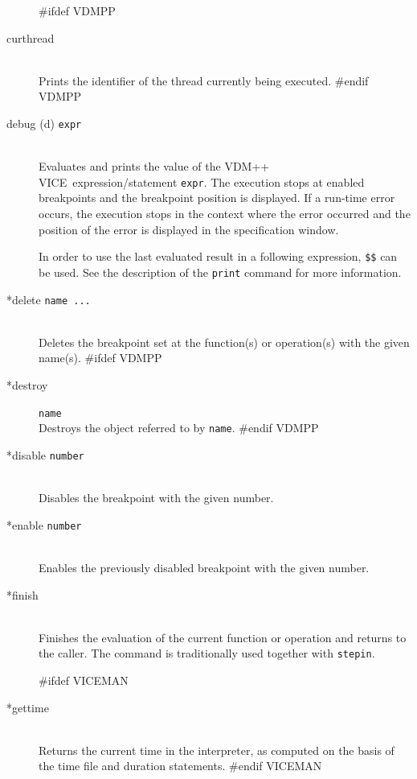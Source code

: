 \documentclass[\pformat,12pt]{article}
\newcommand{\vdmslpp}{VDM-SL}
\newcommand{\vdmslpp}{VDM++}
\renewcommand{\vdmslpp}{VDM++ VICE}
\begin{document}
\begin{description}
#ifdef VDMPP
\item[curthread]\mbox{}\\
  Prints the identifier of the thread currently being executed.
#endif VDMPP

\item[debug (d) {\tt expr}]  \mbox{}\\
  Evaluates and prints the value of the \vdmslpp\ expression/statement
  {\tt expr}.  The execution stops at enabled breakpoints
   and the breakpoint position is displayed. If a
  run-time error occurs, the execution stops in the context
  where the error occurred and the position of the error is
  displayed in the specification window.
  
  In order to use the last evaluated result in a following
  expression, {\tt \$\$}\index{\$\$} can be used. See the description
  of the {\tt print} command for more information.
    
\item[*delete {\tt name ...}] \mbox{}\\
  Deletes the breakpoint set at the function(s) or
  operation(s) with the given
  name(s). 
#ifdef VDMPP
\item[*destroy] {\tt name}\mbox{}\\
  Destroys the object referred to by {\tt name}.
#endif VDMPP

\item[*disable \texttt{number}]
\mbox{}\\
  Disables the breakpoint with the given number.

\item[*enable \texttt{number}]
\mbox{}\\
  Enables the previously disabled breakpoint with the given number.

\item[*finish]\mbox{}\\
  Finishes the evaluation of the current function or
  operation and returns to the
  caller. The command is traditionally used together with {\tt stepin}.

#ifdef VICEMAN
\item[*gettime]\mbox{}\\
  Returns the current time in the interpreter, as computed 
  on the basis of the time file and duration statements.
#endif VICEMAN


\end{description}
\end{document}
